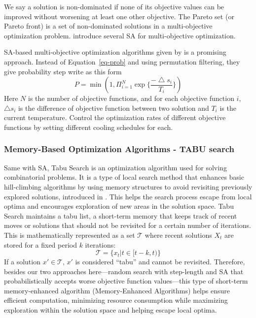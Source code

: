 \documentclass[
  a4paper,
  oneside,
  openany,
  12pt,
  onecolumn]{book}
\theoremstyle{plain}
\theoremstyle{definition}
\theoremstyle{remark}
\begin{document}
We say a solution is non-dominated if none of its objective values can
be improved without worsening at least one other objective. The Pareto
set (or Pareto front) is a set of non-dominated solutions in a
multi-objective optimization problem. \citet{suman2006survey} introduce
several SA for multi-objective optimization.

SA-based multi-objective optimization algorithms given by
\citet{suppapitnarm2000simulated} is a promising approach. Instead of
Equation~\ref{eq-prob} and using permutation filtering, they give
probability step write as this form \[
P = \min(1, \Pi_{i=1}^N\exp\{\frac{-\bigtriangleup s_i}{T_i}\})
\] Here \(N\) is the number of objective functions, and for each
objective function \(i\), \(\bigtriangleup s_i\) is the difference of
objective function between two solution and \(T_i\) is the current
temperature. Control the optimization rates of different objective
functions by setting different cooling schedules for each.

\subsubsection{Memory-Based Optimization Algorithms - TABU
search}\label{memory-based-optimization-algorithms---tabu-search}

Same with SA, Tabu Search is an optimization algorithm used for solving
combinatorial problems. It is a type of local search method that
enhances basic hill-climbing algorithms by using memory structures to
avoid revisiting previously explored solutions, introduced in
\citet{butler2013model}. This helps the search process escape from local
optima and encourages exploration of new areas in the solution space.
Tabu Search maintains a tabu list, a short-term memory that keeps track
of recent moves or solutions that should not be revisited for a certain
number of iterations. This is mathematically represented as a set
\(\mathcal{T}\) where recent solutions \(X_t\) are stored for a fixed
period \(k\) iterations: \[
\mathcal{T} = \{x_t|t \in [t-k,t)\}
\] If a solution \(x' \in \mathcal{T}\), \(x'\) is considered ``tabu''
and cannot be revisited. Therefore, besides our two approaches
here---random search with step-length and SA that probabilistically
accepts worse objective function values---this type of short-term
memory-enhanced algorithm (Memory-Enhanced Algorithms) helps ensure
efficient computation, minimizing resource consumption while maximizing
exploration within the solution space and helping escape local optima.
\end{document}
